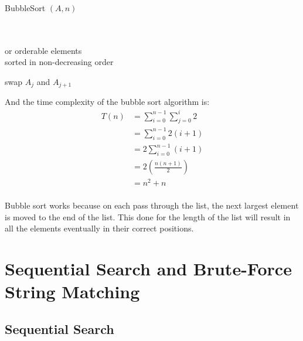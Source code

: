 \documentclass[12pt letter]{report}
\begin{document}
\begin{algorithm}[H]
  \caption{BubbleSort $ \left( A, n \right) $}
  \Comment{}\\
   \\
   or orderable elements \\
   sorted in non-decreasing order \\
  \begin{algorithmic}[1]
    \State swap $A_j$ and $A_{j+1}$
    \EndIf
    \EndFor
    \EndFor
  \end{algorithmic}
\end{algorithm}

And the time complexity of the bubble sort algorithm is:
\begin{align*}
  T \left( n \right) & = \displaystyle\sum_{i=0}^{n - 1} \displaystyle\sum_{j=0}^{i} 2 \\
                     & = \displaystyle\sum_{i=0}^{n-1} 2 \left( i + 1 \right)          \\
                     & = 2 \displaystyle\sum_{i=0}^{n-1} \left( i + 1 \right)          \\
                     & = 2 \left( \frac{n \left( n + 1 \right)}{2} \right)             \\
                     & = n^2 + n                                                       \\
\end{align*}

Bubble sort works because on each pass through the list, the next largest element is moved to the end of the list. This
done for the length of the list will result in all the elements eventually in their correct positions.

\chapter{Sequential Search and Brute-Force String Matching}

\section{Sequential Search}

\end{document}
